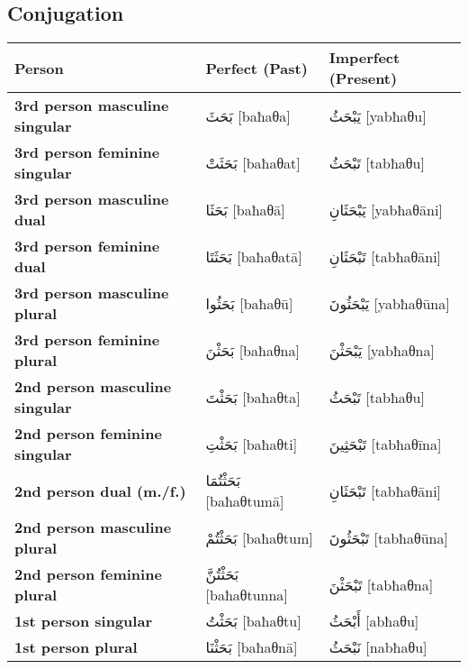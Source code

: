 \documentclass[letter,12pt]{article}
\begin{document}
\subsection{Conjugation}
\begin{longtable}{|>{\raggedright}p{3.5cm}|p{5cm}|p{5cm}|}
\hline
\textbf{Person} & \textbf{Perfect (Past)} & \textbf{Imperfect (Present)} \\
\hline
\textbf{3rd person masculine singular} & \textarabic{بَحَثَ} [baħaθa] & \textarabic{يَبْحَثُ} [yabħaθu] \\
\hline
\textbf{3rd person feminine singular} & \textarabic{بَحَثَتْ} [baħaθat] & \textarabic{تَبْحَثُ} [tabħaθu] \\
\hline
\textbf{3rd person masculine dual} & \textarabic{بَحَثَا} [baħaθā] & \textarabic{يَبْحَثَانِ} [yabħaθāni] \\
\hline
\textbf{3rd person feminine dual} & \textarabic{بَحَثَتَا} [baħaθatā] & \textarabic{تَبْحَثَانِ} [tabħaθāni] \\
\hline
\textbf{3rd person masculine plural} & \textarabic{بَحَثُوا} [baħaθū] & \textarabic{يَبْحَثُونَ} [yabħaθūna] \\
\hline
\textbf{3rd person feminine plural} & \textarabic{بَحَثْنَ} [baħaθna] & \textarabic{يَبْحَثْنَ} [yabħaθna] \\
\hline
\textbf{2nd person masculine singular} & \textarabic{بَحَثْتَ} [baħaθta] & \textarabic{تَبْحَثُ} [tabħaθu] \\
\hline
\textbf{2nd person feminine singular} & \textarabic{بَحَثْتِ} [baħaθti] & \textarabic{تَبْحَثِينَ} [tabħaθīna] \\
\hline
\textbf{2nd person dual (m./f.)} & \textarabic{بَحَثْتُمَا} [baħaθtumā] & \textarabic{تَبْحَثَانِ} [tabħaθāni] \\
\hline
\textbf{2nd person masculine plural} & \textarabic{بَحَثْتُمْ} [baħaθtum] & \textarabic{تَبْحَثُونَ} [tabħaθūna] \\
\hline
\textbf{2nd person feminine plural} & \textarabic{بَحَثْتُنَّ} [baħaθtunna] & \textarabic{تَبْحَثْنَ} [tabħaθna] \\
\hline
\textbf{1st person singular} & \textarabic{بَحَثْتُ} [baħaθtu] & \textarabic{أَبْحَثُ} [abħaθu] \\
\hline
\textbf{1st person plural} & \textarabic{بَحَثْنَا} [baħaθnā] & \textarabic{نَبْحَثُ} [nabħaθu] \\
\hline
\end{longtable}
\end{document}
